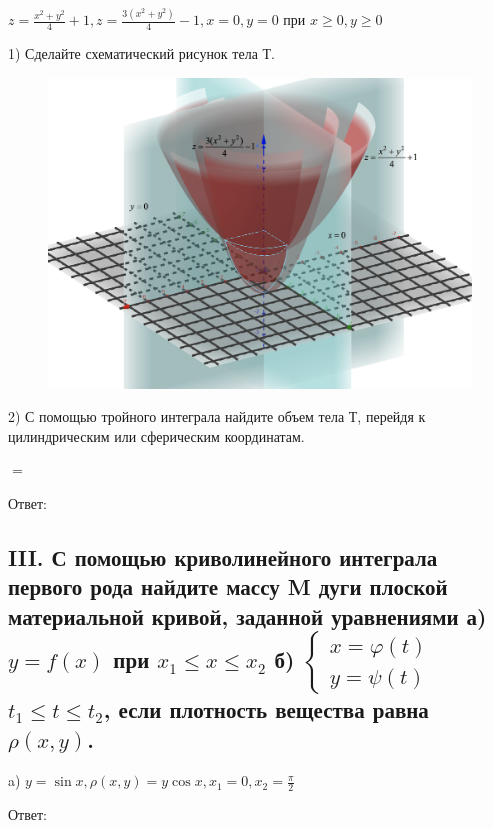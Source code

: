 \documentclass[12pt]{article}
\begin{document}
$z=\frac{x^{2}+y^{2}}{4}+1, z=\frac{3\left(x^{2}+y^{2}\right)}{4}-1, x=0, y=0 \text { при }x \geq 0, y \geq 0$\vspace{2.5mm}

1) Сделайте схематический рисунок тела Т.

\begin{figure}[ht!]
	\centering
	\includegraphics[width=\textwidth]{Figures/2.png}
\end{figure}

2) С помощью тройного интеграла найдите объем тела Т,
перейдя к цилиндрическим или сферическим координатам. 

$=$\vspace{2.5mm}

Ответ: $ $\vspace{2.5mm}

\subsection*{III. С помощью криволинейного интеграла первого рода
найдите массу M дуги плоской материальной кривой, заданной уравнениями а) $y=f(x)$ при $x_{1} \leq x \leq x_{2}$ б) $\left\{\begin{array}{l} x=\varphi(t) \\ y=\psi(t) \end{array}\right.$ $t_{1} \leq t \leq t_{2}$, если плотность вещества равна $\rho(x, y)$.}

a) $y=\sin x, \rho(x, y)=y \cos x, x_{1}=0, x_{2}=\frac{\pi}{2}$\vspace{2.5mm}

Ответ: $ $\vspace{2.5mm}
\end{document}
